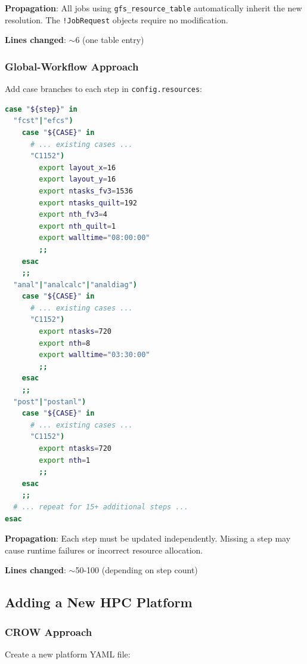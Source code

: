 \documentclass[11pt,twoside]{article}
\newcommand{\gw}{\textsc{Global-Workflow}}
\begin{document}
\textbf{Propagation}: All jobs using \texttt{gfs\_resource\_table} automatically inherit the new resolution. The \texttt{!JobRequest} objects require no modification.

\textbf{Lines changed}: $\sim$6 (one table entry)

\subsubsection{Global-Workflow Approach}

Add case branches to each step in \texttt{config.resources}:

\begin{lstlisting}[language=Bash, caption={Adding C1152 to \gw{}}]
case "${step}" in
  "fcst"|"efcs")
    case "${CASE}" in
      # ... existing cases ...
      "C1152")
        export layout_x=16
        export layout_y=16
        export ntasks_fv3=1536
        export ntasks_quilt=192
        export nth_fv3=4
        export nth_quilt=1
        export walltime="08:00:00"
        ;;
    esac
    ;;
  "anal"|"analcalc"|"analdiag")
    case "${CASE}" in
      # ... existing cases ...
      "C1152")
        export ntasks=720
        export nth=8
        export walltime="03:30:00"
        ;;
    esac
    ;;
  "post"|"postanl")
    case "${CASE}" in
      # ... existing cases ...
      "C1152")
        export ntasks=720
        export nth=1
        ;;
    esac
    ;;
  # ... repeat for 15+ additional steps ...
esac
\end{lstlisting}

\textbf{Propagation}: Each step must be updated independently. Missing a step may cause runtime failures or incorrect resource allocation.

\textbf{Lines changed}: $\sim$50-100 (depending on step count)

\subsection{Adding a New HPC Platform}

\subsubsection{CROW Approach}

Create a new platform YAML file:
\end{document}
